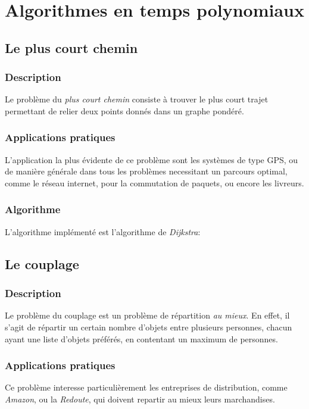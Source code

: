 \section{Algorithmes en temps polynomiaux}
    \subsection{Le plus court chemin}
        \subsubsection{Description}
        Le problème du \emph{plus court chemin} consiste à trouver
        le plus court trajet permettant de relier deux points donnés dans un graphe pondéré.
        \subsubsection{Applications pratiques}
            L'application la plus évidente de ce problème sont les systèmes de type
            GPS, ou de manière générale dans tous les problèmes necessitant
            un parcours optimal, comme le réseau internet, pour la commutation de
            paquets, ou encore les livreurs.
        \subsubsection{Algorithme} %
	L'algorithme implémenté est l'algorithme de \emph{Dijkstra}:

    \subsection{Le couplage}
        \subsubsection{Description}
            Le problème du couplage est un problème de répartition \emph{au mieux}.
            En effet, il s'agit de répartir un certain nombre d'objets
            entre plusieurs personnes, chacun ayant une liste d'objets
            préférés, en contentant un maximum de personnes.
        \subsubsection{Applications pratiques}
            Ce problème interesse particulièrement les entreprises
            de distribution, comme \emph{Amazon},
            ou la \emph{Redoute}, qui doivent
            repartir au mieux leurs marchandises.
